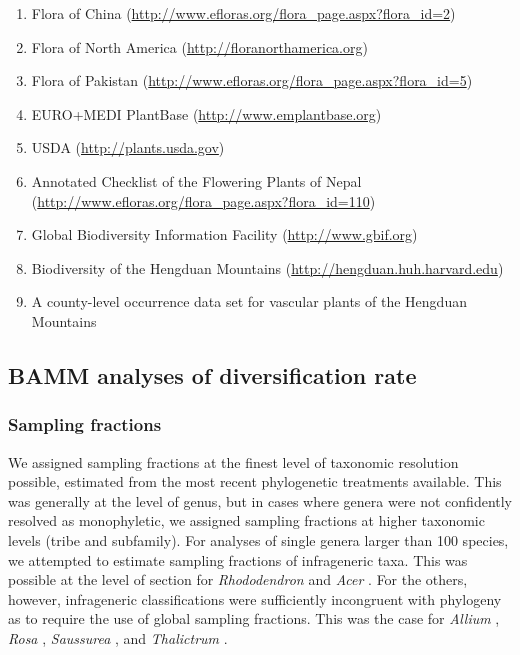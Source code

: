 \begin{enumerate}
\item Flora of China
  (\href{http://www.efloras.org/flora_page.aspx?flora_id=2}{http://www.efloras.org/flora\_page.aspx?flora\_id=2})
\item Flora of North
  America (\href{http://floranorthamerica.org}{http://floranorthamerica.org})
\item Flora of Pakistan
  (\href{http://www.efloras.org/flora\_page.aspx?flora\_id=5}{http://www.efloras.org/flora\_page.aspx?flora\_id=5})
\item EURO+MEDI PlantBase
  (\href{http://www.emplantbase.org}{http://www.emplantbase.org})
\item USDA (\href{http://plants.usda.gov}{http://plants.usda.gov})
\item Annotated Checklist of the Flowering Plants of Nepal
  (\href{http://www.efloras.org/flora\_page.aspx?flora\_id=110}{http://www.efloras.org/flora\_page.aspx?flora\_id=110})
\item Global Biodiversity Information Facility
  (\href{http://www.gbif.org}{http://www.gbif.org})
\item Biodiversity of the Hengduan Mountains
  (\href{http://hengduan.huh.harvard.edu}{http://hengduan.huh.harvard.edu})
\item A county-level occurrence data set for vascular plants of the
  Hengduan Mountains \citep{Zhang2009,Wu2008}
\end{enumerate}

\subsection*{BAMM analyses of diversification rate}

\subsubsection*{Sampling fractions}

We assigned sampling fractions at the finest level of taxonomic
resolution possible, estimated from the most recent phylogenetic
treatments available. This was generally at the level of genus, but in
cases where genera were not confidently resolved as monophyletic, we
assigned sampling fractions at higher taxonomic levels (tribe and
subfamily). For analyses of single genera larger than 100 species, we
attempted to estimate sampling fractions of infrageneric taxa. This
was possible at the level of section for \textit{Rhododendron}
\citep{fang1998} and \textit{Acer} \citep{xu2008}. For the others,
however, infrageneric classifications were sufficiently incongruent
with phylogeny as to require the use of global sampling
fractions. This was the case for \textit{Allium} \citep{li2010},
\textit{Rosa} \citep{bruneau2007}, \textit{Saussurea}
\citep{wang2009}, and \textit{Thalictrum} \citep{soza2012}.

\clearpage
\newpage

\clearpage
\newpage


